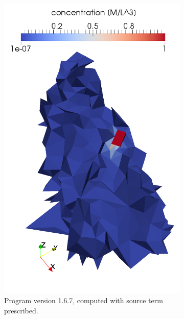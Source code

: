 \begin{figure}[!h]
\begin{subfigure}[b]{0.3\textwidth}
        \includegraphics[width=\textwidth]{tests_graphics/transport_end_167s.pdf}
        \caption{Program version 1.6.7, computed with source term prescribed.}
        \label{fig:bench_mel3b}
    \end{subfigure}
    ~
    \begin{subfigure}[b]{0.3\textwidth}
        \centering

\end{subfigure}
\end{figure}
